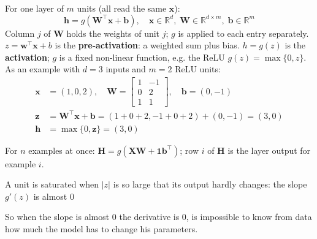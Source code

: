 
For one layer of $m$ units (all read the same $\mathbf{x}$):
\begin{equation}
    \mathbf{h} = g(\mathbf{W}^\top \mathbf{x} + \mathbf{b}), \quad \mathbf{x} \in \mathbb{R}^d, \; \mathbf{W} \in \mathbb{R}^{d \times m}, \; \mathbf{b} \in \mathbb{R}^m
\end{equation}
Column $j$ of $\mathbf{W}$ holds the weights of unit $j$; $g$ is applied to each entry separately.
\newline
$z = \mathbf{w}^\top \mathbf{x} + b$ is the \textbf{pre-activation}: a weighted sum plus bias. $h = g(z)$ is the \textbf{activation}; $g$ is a fixed non-linear function, e.g. the ReLU $g(z) = \max\{0, z\}$.
\newline
As an example with $d = 3$ inputs and $m = 2$ ReLU units:
\begin{align*}
    \mathbf{x} &= (1, 0, 2), \quad \mathbf{W} = \begin{bmatrix} 1 & -1 \\ 0 & 2 \\ 1 & 1 \end{bmatrix}, \quad \mathbf{b} = (0, -1) \\
    \mathbf{z} &= \mathbf{W}^\top \mathbf{x} + \mathbf{b} = (1 + 0 + 2, -1 + 0 + 2) + (0, -1) = (3, 0) \\
    \mathbf{h} &= \max\{0, \mathbf{z}\} = (3, 0)
\end{align*}

For $n$ examples at once: $\mathbf{H} = g(\mathbf{X}\mathbf{W} + \mathbf{1}\mathbf{b}^\top)$; row $i$ of $\mathbf{H}$ is the layer output for example $i$.


\begin{definition}[Saturation]
    A unit is saturated when $|z|$ is so large that its output hardly changes: the slope $g'(z)$ is 
    almost 0
\end{definition}
So when the slope is almost 0 the derivative is 0, is impossible to know from data how much the model
has to change his parameters.
